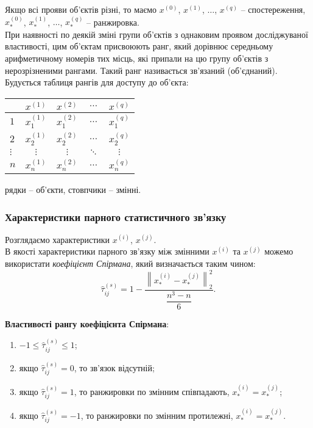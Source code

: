 Якщо всі прояви об'єктів різні, то маємо $x^{(0)}$, $x^{(1)}$, $\ldots$, $x^{(q)}$ -- спостереження, $x_*^{(0)}$, $x_*^{(1)}$, $\ldots$, $x_*^{(q)}$ -- ранжировка. \\

При наявності по деякій зміні групи об'єктів з однаковим проявом досліджуваної властивості, цим об'єктам присвоюють ранг, який дорівнює середньому арифметичному номерів тих місць, які припали на цю групу об'єктів з нерозрізненими рангами. Такий ранг називається зв'язаний (об'єднаний). \\

Будується таблиця рангів для доступу до об'єкта:
\begin{table}[H]
	\centering
	\begin{tabular}{|l|c|c|c|c|}
		\hline
		 & $x^{(1)}$ & $x^{(2)}$ & $\ldots$ & $x^{(q)}$ \\ \hline
		$1$ & $x_1^{(1)}$ & $x_1^{(2)}$ & $\ldots$ & $x_1^{(q)}$ \\ \hline
		$2$ & $x_2^{(1)}$ & $x_2^{(2)}$ & $\ldots$ & $x_2^{(q)}$ \\ \hline
		$\vdots$ & $\vdots$ & $\vdots$ & $\ddots$ & $\vdots$ \\ \hline
		$n$ & $x_n^{(1)}$ & $x_n^{(2)}$ & $\ldots$ & $x_n^{(q)}$ \\ \hline
	\end{tabular}
\end{table}

рядки -- об'єкти, стовпчики -- змінні.

\subsubsection{Характеристики парного статистичного зв'язку}

Розглядаємо характеристики $x^{(i)}$, $x^{(j)}$. \\

В якості характеристики парного зв'язку між змінними $x^{(i)}$ та $x^{(j)}$ можемо використати \textit{коефіцієнт Спірмана}, який визначається таким чином: \[ \widehat{\tau}_{ij}^{(s)} = 1 - \dfrac{\left\|x_*^{(i)}-x_*^{(j)}\right\|_2^2}{\dfrac{n^3-n}{6}}. \]

\textbf{Властивості рангу коефіцієнта Спірмана}:
\begin{enumerate}
	\item $-1 \le \widehat{\tau}_{ij}^{(s)} \le 1$;
	\item якщо $\widehat{\tau}_{ij}^{(s)} = 0$, то зв'язок відсутній;
	\item якщо $\widehat{\tau}_{ij}^{(s)} = 1$, то ранжировки по змінним співпадають, $x_*^{(i)} =x_*^{(j)}$;
	\item якщо $\widehat{\tau}_{ij}^{(s)} = -1$, то ранжировки по змінним протилежні, $x_*^{(i)} =x_*^{(j)}$.
\end{enumerate}

